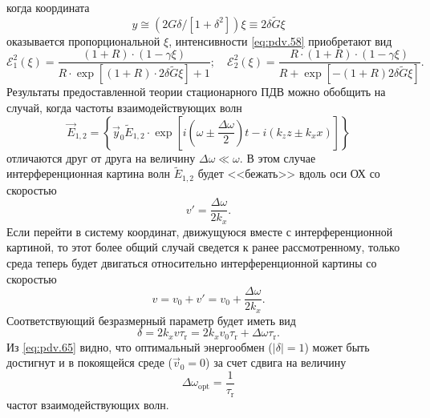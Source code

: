 когда координата
\begin{equation}
	\label{eq:pdv.60}
	y \cong\left(2 G \delta / \left[1+\delta^{2}\right]\right) \xi \equiv 2 \delta \tilde{G} \xi
\end{equation}
оказывается пропорциональной $\xi$, интенсивности \eqref{eq:pdv.58} приобретают вид
\begin{equation}
	\label{eq:pdv.61}
	\mathcal{E}_{1}^{2}(\xi)=\frac{(1+R) \cdot(1-\gamma \xi)}{R \cdot \exp [(1+R) \cdot 2 \delta \tilde{G} \xi]+1};\quad \mathcal{E}_{2}^{2}(\xi)=\frac{R \cdot(1+R) \cdot(1-\gamma \xi)}{R+\exp [-(1+R) 2 \delta \tilde{G} \xi]}.
\end{equation}
Результаты предоставленной теории стационарного ПДВ можно обобщить на случай, когда частоты взаимодействующих волн
\begin{equation}
	\label{eq:pdv.62}
	\vec{E}_{1,2}=\left\{\vec{y}_{0} \tilde{E}_{1,2} \cdot \exp \left[i\left(\omega \pm \frac{\Delta \omega}{2}\right) t-i\left(k_{z} z \pm k_{x} x\right)\right]\right\}
\end{equation}
отличаются друг от друга на величину $\Delta \omega \ll \omega$. В этом случае интерференционная картина волн $\tilde{E}_{1,2}$ будет <<бежать>> вдоль оси ОХ со скоростью
\begin{equation}
	\label{eq:pdv.63}
	v' = \frac{\Delta \omega}{2 k_x}.
\end{equation}
Если перейти в систему координат, движущуюся вместе с интерференционной картиной, то этот более общий случай сведется к ранее рассмотренному, только среда теперь будет двигаться относительно интерференционной картины со скоростью
\begin{equation}
	\label{eq:pdv.64}
	v = v_0 + v' = v_0 + \frac{\Delta \omega}{2 k_x}.
\end{equation}
Соответствующий безразмерный параметр будет иметь вид
\begin{equation}
	\label{eq:pdv.65}
	\delta = 2k_x v \tau_\text{r} = 2k_x v_0 \tau_\text{r} + \Delta \omega \tau_\text{r}.
\end{equation}
Из \eqref{eq:pdv.65} видно, что оптимальный энергообмен ($|\delta| = 1$) может быть достигнут и в покоящейся среде ($\vec{v}_0 = 0$) за счет сдвига на величину
\begin{equation}
	\label{eq:pdv.66}
	\Delta \omega_\text{opt} = \frac{1}{\tau_\text{r}}
\end{equation}
частот взаимодействующих волн.